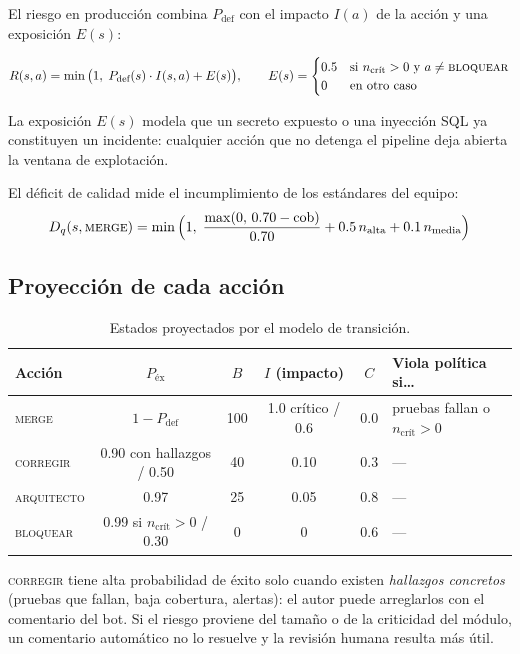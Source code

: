 \documentclass[11pt,a4paper]{article}
\newcommand{\Pdef}{P_{\text{def}}}
\begin{document}
El riesgo en producción combina $\Pdef$ con el impacto $I(a)$ de la acción y una exposición
$E(s)$:

\begin{equation}
R(s,a) = \min\big(1,\; \Pdef(s)\cdot I(s,a) + E(s)\big), \qquad
E(s) = \begin{cases} 0.5 & \text{si } n_{\text{crít}} > 0 \text{ y } a \neq \textsc{bloquear}\\ 0 & \text{en otro caso}\end{cases}
\end{equation}

La exposición $E(s)$ modela que un secreto expuesto o una inyección SQL ya constituyen un incidente:
cualquier acción que no detenga el pipeline deja abierta la ventana de explotación.

El déficit de calidad mide el incumplimiento de los estándares del equipo:
\begin{equation}
D_q(s, \textsc{merge}) = \min\Big(1,\; \frac{\max(0,\, 0.70 - \text{cob})}{0.70} + 0.5\,n_{\text{alta}} + 0.1\,n_{\text{media}}\Big)
\end{equation}

\subsection{Proyección de cada acción}

\begin{table}[H]
\centering
\caption{Estados proyectados por el modelo de transición.}
\label{tab:proyeccion}
\small
\begin{tabularx}{\textwidth}{@{}l c c c c X@{}}
\toprule
\textbf{Acción} & $P_{\text{éx}}$ & $B$ & $I$ (impacto) & $C$ & \textbf{Viola política si\ldots} \\
\midrule
\textsc{merge} & $1-\Pdef$ & 100 & 1.0 crítico / 0.6 & 0.0 & pruebas fallan o $n_{\text{crít}}>0$ \\
\textsc{corregir} & 0.90 con hallazgos / 0.50 & 40 & 0.10 & 0.3 & --- \\
\textsc{arquitecto} & 0.97 & 25 & 0.05 & 0.8 & --- \\
\textsc{bloquear} & 0.99 si $n_{\text{crít}}>0$ / 0.30 & 0 & 0 & 0.6 & --- \\
\bottomrule
\end{tabularx}
\end{table}

\textsc{corregir} tiene alta probabilidad de éxito solo cuando existen \emph{hallazgos concretos}
(pruebas que fallan, baja cobertura, alertas): el autor puede arreglarlos con el comentario del bot.
Si el riesgo proviene del tamaño o de la criticidad del módulo, un comentario automático no lo
resuelve y la revisión humana resulta más útil.
\end{document}

